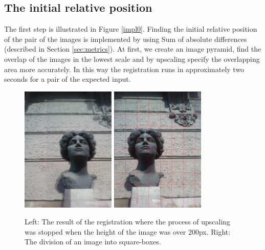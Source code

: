 \subsection{The initial relative position}
The first step is illustrated in Figure \ref{impl0}.
Finding the initial relative position of the pair of the images is implemented by using Sum of absolute differences (described in Section \ref{sec:metrics}).
At first, we create an image pyramid, find the overlap of the images in the lowest scale and by upscaling specify the overlapping area more accurately.
In this way the registration runs in approximately two seconds for a pair of the expected input.

\begin{figure}[H]
\centerline{
\includegraphics[width=4.5cm]{img/ema_overlap.png}
\includegraphics[width=4.5cm]{img/ema_buckets.png}}
\caption{Left: The result of the registration where the process of upscaling was stopped when the height of the image was over 200px. Right: The division of an image into square-boxes.}
\label{fig:overlap_and_buckets}
\end{figure}


